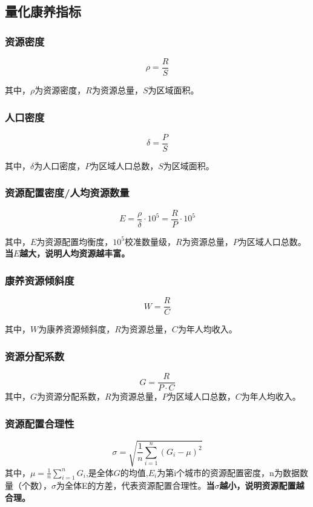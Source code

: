 \documentclass[12pt,a4paper]{article}
\begin{document}
\begin{multicols}{2}
\subsection{量化康养指标}

\subsubsection{资源密度}
\[
\rho = \frac{R}{S}
\]

其中，$\rho$为资源密度，$R$为资源总量，$S$为区域面积。

\subsubsection{人口密度}
\[
\delta = \frac{P}{S}
\]

其中，$\delta$为人口密度，$P$为区域人口总数，$S$为区域面积。

\subsubsection{资源配置密度/人均资源数量}
\[
E = \frac{\rho}{\delta}\cdot 10^5=\frac{R}{P}\cdot 10^5
\]

其中，$E$为资源配置均衡度，$10^5$校准数量级，$R$为资源总量，$P$为区域人口总数。\textbf{当$E$越大，说明人均资源越丰富。}

\subsubsection{康养资源倾斜度}

\[
W=\frac{R}{C}
\]

其中，$W$为康养资源倾斜度，$R$为资源总量，$C$为年人均收入。

\subsubsection{资源分配系数}

\[
G=\frac{R}{P\cdot C}
\]
其中，$G$为资源分配系数，$R$为资源总量，$P$为区域人口总数，$C$为年人均收入。

\subsubsection{资源配置合理性}
\[
\sigma = \sqrt{\frac{1}{n} \sum_{i=1}^{n}(G_i - \mu)^2}
\]
其中，$\mu = \frac{1}{n} \sum_{i=1}^{n}G_i$,是全体$G$的均值,$E_i$为第i个城市的资源配置密度，n为数据数量（个数），$\sigma$为全体E的方差，代表资源配置合理性。\textbf{当$\sigma$越小，说明资源配置越合理。}


\end{multicols}
\end{document}

